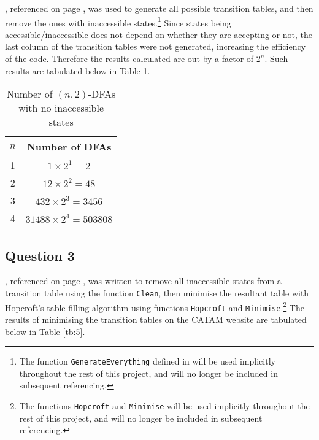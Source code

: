 \documentclass[10pt,a4paper,notitlepage]{article}
\begin{document}
, referenced on page \pageref{cd:3}, was used to generate all possible transition tables, and then remove the ones with inaccessible states.\footnote{The function \texttt{GenerateEverything} defined in  will be used implicitly throughout the rest of this project, and will no longer be included in subsequent referencing.} Since states being accessible/inaccessible does not depend on whether they are accepting or not, the last column of the transition tables were not generated, increasing the efficiency of the code. Therefore the results calculated are out by a factor of $2^{n}$. Such results are tabulated below in Table \ref{tb:4}.
\begin{table}[H]
\centering
\begin{tabular}{c|c}
$n$ & Number of DFAs\\
\hline
1 & $1\times 2^{1}=2$\\
2 & $12\times 2^{2}=48$\\
3 & $432\times 2^{3}=3456$\\
4 & $31488\times 2^{4}=503808$
\end{tabular}
\caption{Number of $(n,2)$-DFAs with no inaccessible states}\label{tb:4}
\end{table}
\subsection*{\centering Question 3}
, referenced on page \pageref{cd:4}, was written to remove all inaccessible states from a transition table using the function \texttt{Clean}, then minimise the resultant table with Hopcroft's table filling algorithm using functions \texttt{Hopcroft} and \texttt{Minimise}.\footnote{The functions \texttt{Hopcroft} and \texttt{Minimise} will be used implicitly throughout the rest of this project, and will no longer be included in subsequent referencing.} The results of minimising the transition tables on the CATAM website are tabulated below in Table \ref{tb:5}.
\end{document}
